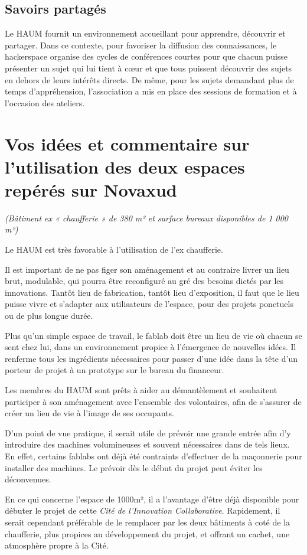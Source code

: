 \documentclass[a4paper,10pt]{scrartcl}
\begin{document}
\subsection*{Savoirs partagés}
Le HAUM fournit un environnement accueillant pour apprendre, découvrir et partager.
Dans ce contexte, pour favoriser la diffusion des connaissances, le hackerspace organise des cycles de conférences courtes pour que chacun puisse présenter un sujet qui lui tient à cœur et que tous puissent découvrir des sujets en dehors de leurs intérêts directs. De même, pour les sujets demandant plus de temps d'appréhension, l'association a mis en place des sessions de formation et à l'occasion des ateliers.

\section{Vos idées et commentaire sur l’utilisation des deux espaces repérés sur Novaxud}
\emph{(Bâtiment ex « chaufferie » de 380 m² et surface bureaux disponibles de 1 000 m²)}

Le HAUM est très favorable à l'utilisation de l'ex chaufferie.

Il est important de ne pas figer son aménagement et au contraire livrer un lieu brut, modulable, qui pourra être reconfiguré au gré des besoins dictés par les innovations. Tantôt lieu de fabrication, tantôt lieu d'exposition, il faut que le lieu puisse vivre et s'adapter aux utilisateurs de l'espace, pour des projets ponctuels ou de plus longue durée. 

Plus qu'un simple espace de travail, le fablab doit être un lieu de vie où chacun se sent chez lui, dans un environnement propice à l'émergence de nouvelles idées.
Il renferme tous les ingrédients nécessaires pour passer d'une idée dans la tête d'un porteur de projet à un prototype sur le bureau du financeur.

Les membres du HAUM sont prêts à aider au démantèlement et souhaitent participer à son aménagement avec l'ensemble des volontaires, afin de s'assurer de créer un lieu de vie à l'image de ses occupants.

D'un point de vue pratique, il serait utile de prévoir une grande entrée afin d'y introduire des machines volumineuses et souvent nécessaires dans de tels lieux. En effet, certains fablabs ont déjà été contraints d'effectuer de la maçonnerie pour installer des machines. Le prévoir dès le début du projet peut éviter les déconvenues.

En ce qui concerne l'espace de 1000m², il a l'avantage d'être déjà disponible pour débuter le projet de cette \emph{Cité de l'Innovation Collaborative}. Rapidement, il serait cependant préférable de le remplacer par les deux bâtiments à coté de la chaufferie, plus propices au développement du projet, et offrant un cachet, une atmosphère propre à la Cité. 
\end{document}
